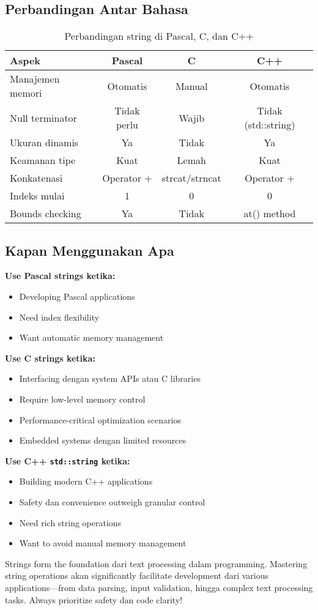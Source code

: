 \documentclass[../main.tex]{subfiles}
\begin{document}
\subsection{Perbandingan Antar Bahasa}

\begin{table}[H]
\centering
\begin{tabular}{|l|c|c|c|}
\hline
\textbf{Aspek} & \textbf{Pascal} & \textbf{C} & \textbf{C++} \\
\hline
Manajemen memori & Otomatis & Manual & Otomatis \\
\hline
Null terminator & Tidak perlu & Wajib & Tidak (std::string) \\
\hline
Ukuran dinamis & Ya & Tidak & Ya \\
\hline
Keamanan tipe & Kuat & Lemah & Kuat \\
\hline
Konkatenasi & Operator + & strcat/strncat & Operator + \\
\hline
Indeks mulai & 1 & 0 & 0 \\
\hline
Bounds checking & Ya & Tidak & at() method \\
\hline
\end{tabular}
\caption{Perbandingan string di Pascal, C, dan C++}
\end{table}

\subsection{Kapan Menggunakan Apa}

\textbf{Use Pascal strings ketika:}
\begin{itemize}
  \item Developing Pascal applications
  \item Need index flexibility
  \item Want automatic memory management
\end{itemize}

\textbf{Use C strings ketika:}
\begin{itemize}
  \item Interfacing dengan system APIs atau C libraries
  \item Require low-level memory control
  \item Performance-critical optimization scenarios
  \item Embedded systems dengan limited resources
\end{itemize}

\textbf{Use C++ \texttt{std::string} ketika:}
\begin{itemize}
  \item Building modern C++ applications
  \item Safety dan convenience outweigh granular control
  \item Need rich string operations
  \item Want to avoid manual memory management
\end{itemize}

Strings form the foundation dari text processing dalam programming. Mastering string operations akan significantly facilitate development dari various applications—from data parsing, input validation, hingga complex text processing tasks. Always prioritize safety dan code clarity!
\end{document}
